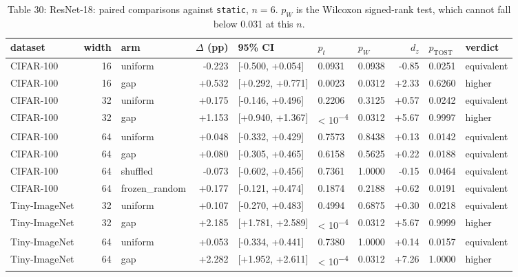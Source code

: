 \documentclass{article}
\begin{document}
\begin{table}
\caption{Table 30: ResNet-18: paired comparisons against \texttt{static}, $n=6$. $p_W$ is the
Wilcoxon signed-rank test, which cannot fall below 0.031 at this $n$.}

\begin{tabular}{l r l r l ll r l l}
\toprule
dataset & width & arm & $\Delta$ (pp) & 95\% CI & $p_t$ & $p_W$ & $d_z$ & $p_{\text{TOST}}$ & verdict \\
\midrule
CIFAR‑100 & 16 & uniform & -0.223 & [-0.500, +0.054] & 0.0931 & 0.0938 & -0.85 & 0.0251 & equivalent \\
CIFAR‑100 & 16 & gap & +0.532 & [+0.292, +0.771] & 0.0023 & 0.0312 & +2.33 & 0.6260 & higher \\
CIFAR‑100 & 32 & uniform & +0.175 & [-0.146, +0.496] & 0.2206 & 0.3125 & +0.57 & 0.0242 & equivalent \\
CIFAR‑100 & 32 & gap & +1.153 & [+0.940, +1.367] & < 10\textsuperscript{−4} & 0.0312 & +5.67 & 0.9997 & higher \\
CIFAR‑100 & 64 & uniform & +0.048 & [-0.332, +0.429] & 0.7573 & 0.8438 & +0.13 & 0.0142 & equivalent \\
CIFAR‑100 & 64 & gap & +0.080 & [-0.305, +0.465] & 0.6158 & 0.5625 & +0.22 & 0.0188 & equivalent \\
CIFAR‑100 & 64 & shuffled & -0.073 & [-0.602, +0.456] & 0.7361 & 1.0000 & -0.15 & 0.0464 & equivalent \\
CIFAR‑100 & 64 & frozen\_random & +0.177 & [-0.121, +0.474] & 0.1874 & 0.2188 & +0.62 & 0.0191 & equivalent \\
Tiny‑ImageNet & 32 & uniform & +0.107 & [-0.270, +0.483] & 0.4994 & 0.6875 & +0.30 & 0.0218 & equivalent \\
Tiny‑ImageNet & 32 & gap & +2.185 & [+1.781, +2.589] & < 10\textsuperscript{−4} & 0.0312 & +5.67 & 0.9999 & higher \\
Tiny‑ImageNet & 64 & uniform & +0.053 & [-0.334, +0.441] & 0.7380 & 1.0000 & +0.14 & 0.0157 & equivalent \\
Tiny‑ImageNet & 64 & gap & +2.282 & [+1.952, +2.611] & < 10\textsuperscript{−4} & 0.0312 & +7.26 & 1.0000 & higher \\
\bottomrule
\end{tabular}
\end{table}
\end{document}
